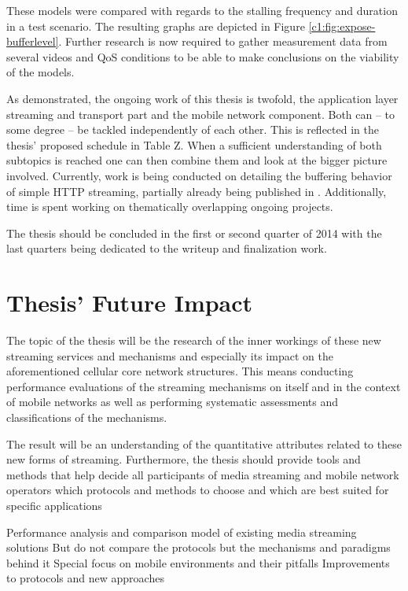 These models were compared with regards to the stalling frequency and duration in a test scenario. The resulting graphs are depicted in Figure \ref{c1:fig:expose-bufferlevel}. Further research is now required to gather measurement data from several videos and QoS conditions to be able to make conclusions on the viability of the models.




As demonstrated, the ongoing work of this thesis is twofold, the application layer streaming and transport part and the mobile network component. Both can -- to some degree -- be tackled independently of each other. This is reflected in the thesis' proposed schedule in Table Z. When a sufficient understanding of both subtopics is reached one can then combine them and look at the bigger picture involved. Currently, work is being conducted on detailing the buffering behavior of simple HTTP streaming, partially already being published in \cite{metzger2011delivery}. Additionally, time is spent working on thematically overlapping ongoing projects.

The thesis should be concluded in the first or second quarter of 2014 with the last quarters being dedicated to the writeup and finalization work.


\section{Thesis' Future Impact}

The topic of the thesis will be the research of the inner workings of these new streaming services and mechanisms and especially its impact on the aforementioned cellular core network structures. This means conducting performance evaluations of the streaming mechanisms on itself and in the context of mobile networks as well as performing systematic assessments and classifications of the mechanisms. 

The result will be an understanding of the quantitative attributes related to these new forms of streaming. Furthermore, the thesis should provide tools and methods that help decide all participants of media streaming and mobile network operators which protocols and methods to choose and which are best suited for specific applications


    Performance analysis and comparison model of existing media streaming solutions
      But do not compare the protocols but the mechanisms and paradigms behind it
    Special focus on mobile environments and their pitfalls
    Improvements to protocols and new approaches

